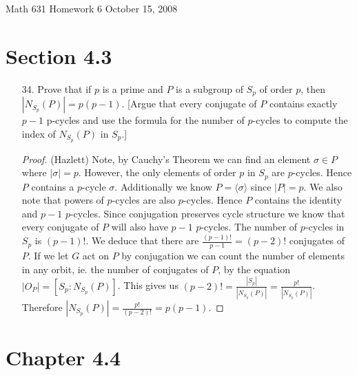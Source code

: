 \documentclass[10pt]{article}
\newcommand\header{{\sc Math 631 \hfill Homework 6 \hfill October 15, 2008}}
\begin{document}
\header  

\section*{Section 4.3}

\begin{itemize}

\item[34.] Prove that if $p$ is a prime and $P$ is a subgroup of $S_p$ of order $p$, then $|N_{S_p}(P)| = p(p-1)$.  [Argue that every conjugate of $P$ contains exactly $p-1$ p-cycles and use the formula for the number of $p$-cycles to compute the index of $N_{S_p}(P)$ in $S_p$.]

\begin{proof}(Hazlett)
Note, by Cauchy's Theorem we can find an element $\sigma \in P$ where $|\sigma| = p$.  However, the only elements of order $p$ in $S_p$ are $p$-cycles.  Hence $P$ contains a $p$-cycle $\sigma$.  Additionally we know $P = \langle\sigma\rangle$ since $|P| = p$.  We also note that powers of $p$-cycles are also $p$-cycles.  Hence $P$ contains the identity and $p-1$ $p$-cycles.  Since conjugation preserves cycle structure we know that every conjugate of $P$ will also have $p-1$ $p$-cycles.  The number of $p$-cycles in $S_p$ is $(p-1)!$.  We deduce that there are $\frac{(p-1)!}{p-1} = (p-2)!$ conjugates of $P$.  If we let $G$ act on $P$ by conjugation we can count the number of elements in any orbit, ie. the number of conjugates of $P$, by the equation $|O_P| = [S_p:N_{S_p}(P)]$.  This gives us $(p-2)! = \frac{|S_p|}{|N_{S_p}(P)|} = \frac{p!}{|N_{S_p}(P)|}$.  Therefore $|N_{S_p}(P)| = \frac{p!}{(p-2)!} = p(p-1)$.
\end{proof}

\end{itemize}

\section*{Chapter 4.4}
\end{document}
